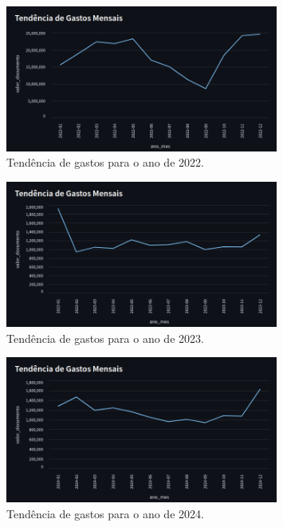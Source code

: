 \documentclass[12pt, a4paper]{article}
\begin{document}
\newpage

\begin{figure}[!htbp]
	\centering
	\includegraphics[width=0.8\textwidth]{assets/2_plot10.png}
	\caption{Tendência de gastos para o ano de 2022.}
	\label{fig:tendencia de gastos}
\end{figure}
\newpage

\begin{figure}[!htbp]
	\centering
	\includegraphics[width=0.8\textwidth]{assets/2_plot11.png}
	\caption{Tendência de gastos para o ano de 2023.}
	\label{fig:tendencia de gastos}
\end{figure}

\begin{figure}[!htbp]
	\centering
	\includegraphics[width=0.8\textwidth]{assets/2_plot12.png}
	\caption{Tendência de gastos para o ano de 2024.}
	\label{fig:tendencia de gastos}
\end{figure}
\end{document}
